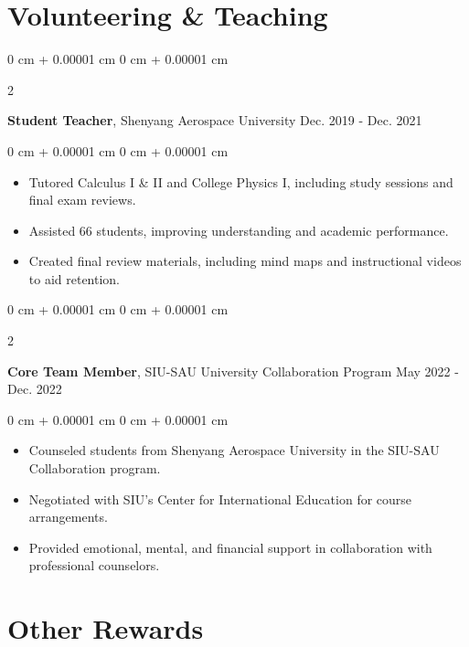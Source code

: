 \documentclass[10pt, letterpaper]{article}
\newenvironment{highlights}{
    \begin{itemize}[
        topsep=0.10 cm,
        parsep=0.10 cm,
        partopsep=0pt,
        itemsep=0pt,
        leftmargin=0 cm + 10pt
    ]
}{
    \end{itemize}
} %
\newenvironment{onecolentry}{
    \begin{adjustwidth}{
        0 cm + 0.00001 cm
    }{
        0 cm + 0.00001 cm
    }
}{
    \end{adjustwidth}
} %
\newenvironment{twocolentry}[2][]{
    \onecolentry
    \def\secondColumn{#2}
    \setcolumnwidth{\fill, 4.5 cm}
    \begin{paracol}{2}
}{ 
    \switchcolumn \raggedleft \secondColumn
    \end{paracol}
    \endonecolentry
} %
\begin{document}
    \vspace{0.2 cm}

    \section{Volunteering \& Teaching}

    \begin{twocolentry}{
        Dec. 2019 - Dec. 2021
    }
        \textbf{Student Teacher}, Shenyang Aerospace University\end{twocolentry}

    \vspace{0.10 cm}
    \begin{onecolentry}
        \begin{highlights}
            \item Tutored Calculus I \& II and College Physics I, including study sessions and final exam reviews.
            \item Assisted 66 students, improving understanding and academic performance.
            \item Created final review materials, including mind maps and instructional videos to aid retention.
        \end{highlights}
    \end{onecolentry}

    \vspace{0.2 cm}

    \begin{twocolentry}{
        May 2022 - Dec. 2022
    }
        \textbf{Core Team Member}, SIU-SAU University Collaboration Program\end{twocolentry}

    \vspace{0.10 cm}
    \begin{onecolentry}
        \begin{highlights}
            \item Counseled students from Shenyang Aerospace University in the SIU-SAU Collaboration program.
            \item Negotiated with SIU's Center for International Education for course arrangements.
            \item Provided emotional, mental, and financial support in collaboration with professional counselors.
        \end{highlights}
    \end{onecolentry}


    \section{Other Rewards}
\end{document}
